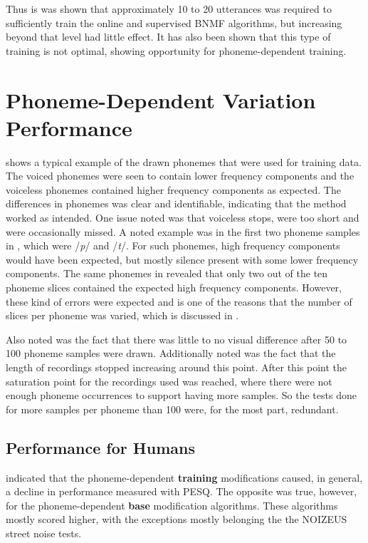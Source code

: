 Thus is was shown that approximately 10 to 20 utterances was required
to sufficiently train the online and supervised \ac{BNMF} algorithms,
but increasing beyond that level had little effect. It has also been
shown that this type of training is not optimal, showing opportunity
for phoneme-dependent training.

\clearpage{}


\section{Phoneme-Dependent Variation Performance}

 shows a typical example of the
drawn phonemes that were used for training data. The voiced phonemes
were seen to contain lower frequency components and the voiceless
phonemes contained higher frequency components as expected. The differences
in phonemes was clear and identifiable, indicating that the method
worked as intended. One issue noted was that voiceless stops, were
too short and were occasionally missed. A noted example was in the
first two phoneme samples in , which
were /\textit{p}/ and /\textit{t}/. For such phonemes, high frequency
components would have been expected, but mostly silence present with
some lower frequency components. The same phonemes in 
revealed that only two out of the ten phoneme slices contained the
expected high frequency components. However, these kind of errors
were expected and is one of the reasons that the number of slices
per phoneme was varied, which is discussed in .

Also noted was the fact that there was little to no visual difference
after 50 to 100 phoneme samples were drawn. Additionally noted was
the fact that the length of recordings stopped increasing around this
point. After this point the saturation point for the recordings used
was reached, where there were not enough phoneme occurrences to support
having more samples. So the tests done for more samples per phoneme
than 100 were, for the most part, redundant.


\subsection{Performance for Humans}

 indicated that the phoneme-dependent
\textbf{training} modifications caused, in general, a decline in performance
measured with \ac{PESQ}. The opposite was true, however, for the
phoneme-dependent \textbf{base} modification algorithms. These algorithms
mostly scored higher, with the exceptions mostly belonging the the
NOIZEUS street noise tests.

